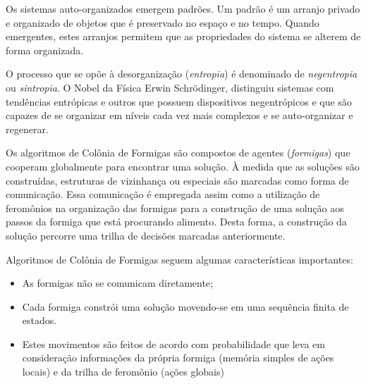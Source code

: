 Os sistemas auto-organizados emergem padrões. Um padrão é um arranjo privado e organizado de objetos que é preservado no espaço e no tempo. Quando emergentes, estes arranjos permitem que as propriedades do sistema se alterem de forma organizada.

O processo que se opõe à desorganização (\emph{entropia}) é denominado de \emph{negentropia} ou \emph{sintropia}. O Nobel da Física Erwin Schrödinger, distinguiu sistemas com tendências entrópicas e outros que possuem dispositivos negentrópicos e que são capazes de se organizar em níveis cada vez mais complexos e se auto-organizar e regenerar. 

Os algoritmos de Colônia de Formigas são compostos de agentes (\emph{formigas}) que cooperam globalmente para encontrar uma solução. À medida que as soluções são construídas, estruturas de vizinhança ou especiais são marcadas como forma de comunicação. Essa comunicação é empregada assim como a utilização de feromônios na organização das formigas para a construção de uma solução aos passos da formiga que está procurando alimento. Desta forma, a construção da solução percorre uma trilha de decisões marcadas anteriormente.

Algoritmos de Colônia de Formigas seguem algumas características importantes:
\begin{itemize}
    \item As formigas não se comunicam diretamente;
    \item Cada formiga constrói uma solução movendo-se em uma sequência finita de estados.
    \item Estes movimentos são feitos de acordo com probabilidade que leva em consideração informações da própria formiga (memória simples de ações locais) e da trilha de feromônio (ações globais)
\end{itemize}

